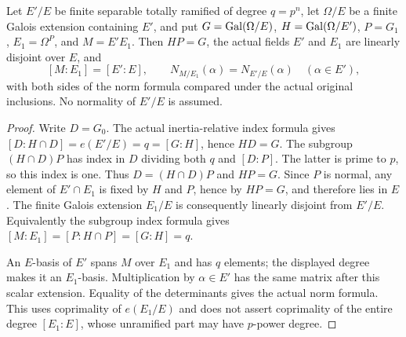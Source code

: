 \begin{lemma}
\label{fw:wild-tame-compositum}
\leanok
Let $E'/E$ be finite separable totally ramified of degree $q=p^n$,
let $\Omega/E$ be a finite Galois extension containing $E'$, and
put $G=\operatorname{Gal}(\Omega/E)$, $H=\operatorname{Gal}(\Omega/E')$, $P=G_1$,
$E_1=\Omega^P$, and $M=E'E_1$.
Then $HP=G$, the actual fields $E'$ and $E_1$ are linearly
disjoint over $E$, and
\[
 [M:E_1]=[E':E],\qquad
 N_{M/E_1}(\alpha)=N_{E'/E}(\alpha)\quad(\alpha\in E'),
\]
with both sides of the norm formula compared under the actual
original inclusions. No normality of $E'/E$ is assumed.
\end{lemma}
\begin{proof}
Write $D=G_0$. The actual inertia-relative index formula gives
$[D:H\cap D]=e(E'/E)=q=[G:H]$, hence $HD=G$.
The subgroup $(H\cap D)P$ has index in $D$ dividing both
$q$ and $[D:P]$. The latter is prime to $p$, so this index
is one. Thus $D=(H\cap D)P$ and $HP=G$.
Since $P$ is normal, any element of $E'\cap E_1$ is fixed
by $H$ and $P$, hence by $HP=G$, and therefore lies in $E$.
The finite Galois extension $E_1/E$ is consequently linearly
disjoint from $E'/E$. Equivalently the subgroup index formula
gives $[M:E_1]=[P:H\cap P]=[G:H]=q$.

An $E$-basis of $E'$ spans $M$ over $E_1$ and has $q$ elements;
the displayed degree makes it an $E_1$-basis. Multiplication
by $\alpha\in E'$ has the same matrix after this scalar
extension. Equality of the determinants gives the actual norm
formula. This uses coprimality of $e(E_1/E)$ and does not assert
coprimality of the entire degree $[E_1:E]$, whose unramified
part may have $p$-power degree.
\end{proof}

